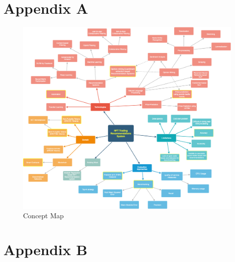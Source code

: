 \chapter{Appendix A}
\label{appendix:A}

\begin{figure}[h!]
\centering
\includegraphics[width=\textwidth]{images/appendix/mind-map.png}
\caption{Concept Map}
\label{fig:concept-map}
\end{figure}

\chapter{Appendix B}

